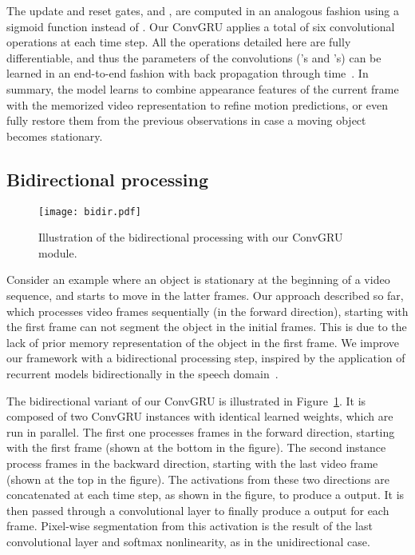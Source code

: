 The update and reset gates,  and , are computed in an analogous
fashion using a sigmoid function instead of . Our ConvGRU applies a
total of six convolutional operations at each time step. All the operations
detailed here are fully differentiable, and thus the parameters of the
convolutions ('s and 's) can be learned in an end-to-end fashion with
back propagation through time~\cite{werbos1990backpropagation}. In summary, the
model learns to combine appearance features of the current frame with the
memorized video representation to refine motion predictions, or even fully
restore them from the previous observations in case a moving object becomes
stationary.

\subsection{Bidirectional processing}
\label{sec:bidirec}
\begin{figure}[t]
\begin{center}
\texttt{[image: bidir.pdf]}
\end{center}
\vspace{-0.3cm}
\caption{Illustration of the bidirectional processing with our ConvGRU module.}
\label{fig:bidir}
\end{figure}
Consider an example where an object is stationary at the beginning of a video
sequence, and starts to move in the latter frames. Our approach described so
far, which processes video frames sequentially (in the forward direction),
starting with the first frame can not segment the object in the initial frames.
This is due to the lack of prior memory representation of the object in the
first frame. We improve our framework with a bidirectional processing step,
inspired by the application of recurrent models bidirectionally in the speech
domain~\cite{graves2005framewise,graves2013hybrid}.

The bidirectional variant of our ConvGRU is illustrated in
Figure~\ref{fig:bidir}. It is composed of two ConvGRU instances with identical
learned weights, which are run in parallel. The first one processes frames in
the forward direction, starting with the first frame (shown at the bottom in
the figure). The second instance process frames in the backward direction,
starting with the last video frame (shown at the top in the figure). The
activations from these two directions are concatenated at each time step, as
shown in the figure, to produce a 
output. It is then passed through a  convolutional layer to finally
produce a  output for each frame.
Pixel-wise segmentation from this activation is the result of the last  convolutional layer and softmax nonlinearity, as in the
unidirectional case.

